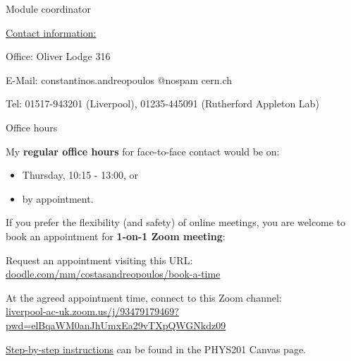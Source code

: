 \begin{frame}{Module coordinator}
\vspace{0.6cm}

\underline{Contact information:}\\
\vspace{0.2cm}
\begin{itemize}
{\small
 \item Office: Oliver Lodge 316
 \item E-Mail: constantinos.andreopoulos @nospam cern.ch
 \item Tel: 01517-943201 (Liverpool), 01235-445091 (Rutherford Appleton Lab)
}
\end{itemize}

\end{frame}

%
%
%

\begin{frame}{Office hours}

My {\bf regular office hours} for face-to-face contact would be on:
\begin{itemize}
  \item Thursday, 10:15 - 13:00, or
  \item by appointment.
\end{itemize}

\vspace{0.3cm}

If you prefer the flexibility (and safety) of online meetings,
you are welcome to book an appointment for {\bf 1-on-1 Zoom meeting}:
\begin{itemize}
{\small
  \item Request an appointment visiting this URL:
  {\color{blue} \scriptsize \url{doodle.com/mm/costasandreopoulos/book-a-time}}
  \item At the agreed appointment time, connect to this Zoom channel:\\
  {\color{blue} \scriptsize \url{liverpool-ac-uk.zoom.us/j/93479179469?pwd=elBqaWM0anJhUmxEa29vTXpQWGNkdz09}}
}
\end{itemize}

\vspace{0.2cm}
\underline{Step-by-step instructions} can be found in the PHYS201 Canvas page.\\

\end{frame}


%
%

